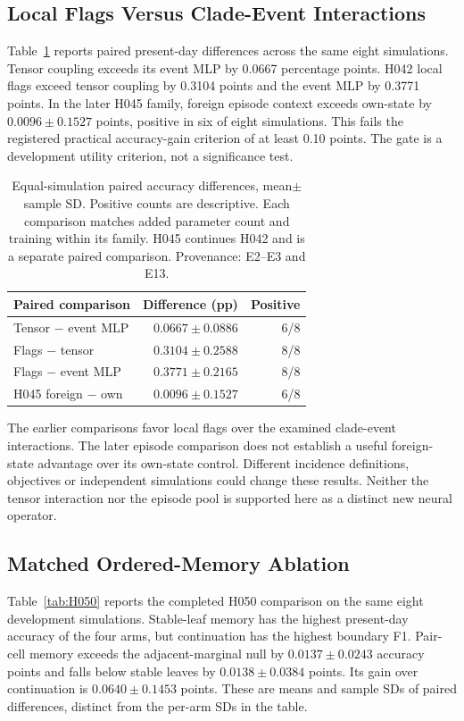 \documentclass[letterpaper]{article}
\begin{document}
\subsection{Local Flags Versus Clade-Event Interactions}
Table~\ref{tab:paired} reports paired present-day differences across the same eight simulations. Tensor coupling exceeds its event MLP by 0.0667 percentage points. H042 local flags exceed tensor coupling by 0.3104 points and the event MLP by 0.3771 points. In the later H045 family, foreign episode context exceeds own-state by $0.0096\pm0.1527$ points, positive in six of eight simulations. This fails the registered practical accuracy-gain criterion of at least 0.10 points. The gate is a development utility criterion, not a significance test.

\begin{table}[t]
\centering
\small
\begin{tabular}{lrr}
\toprule
Paired comparison & Difference (pp) & Positive \\
\midrule
Tensor $-$ event MLP & $0.0667\pm0.0886$ & 6/8 \\
Flags $-$ tensor & $0.3104\pm0.2588$ & 8/8 \\
Flags $-$ event MLP & $0.3771\pm0.2165$ & 8/8 \\
H045 foreign $-$ own & $0.0096\pm0.1527$ & 6/8 \\
\bottomrule
\end{tabular}
\caption{Equal-simulation paired accuracy differences, mean$\pm$sample SD. Positive counts are descriptive. Each comparison matches added parameter count and training within its family. H045 continues H042 and is a separate paired comparison. Provenance: E2--E3 and E13.}
\label{tab:paired}
\end{table}


The earlier comparisons favor local flags over the examined clade-event interactions. The later episode comparison does not establish a useful foreign-state advantage over its own-state control. Different incidence definitions, objectives or independent simulations could change these results. Neither the tensor interaction nor the episode pool is supported here as a distinct new neural operator.

\subsection{Matched Ordered-Memory Ablation}
Table~\ref{tab:H050} reports the completed H050 comparison on the same eight development simulations. Stable-leaf memory has the highest present-day accuracy of the four arms, but continuation has the highest boundary F1. Pair-cell memory exceeds the adjacent-marginal null by $0.0137\pm0.0243$ accuracy points and falls below stable leaves by $0.0138\pm0.0384$ points. Its gain over continuation is $0.0640\pm0.1453$ points. These are means and sample SDs of paired differences, distinct from the per-arm SDs in the table.
\end{document}
